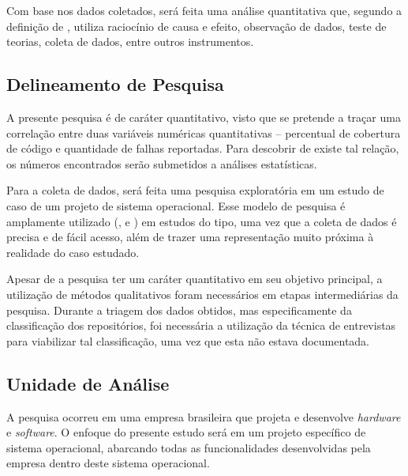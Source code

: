 \documentclass[11.5pt]{article}
\begin{document}
Com base nos dados coletados, será feita uma análise quantitativa que, segundo
a definição de \cite{projetoDePesquisa}, utiliza raciocínio de causa e efeito, observação de dados,
teste de teorias, coleta de dados, entre outros instrumentos.


\subsection{Delineamento de Pesquisa}

A presente pesquisa é de caráter quantitativo, visto que se pretende a traçar uma correlação entre
duas variáveis numéricas quantitativas -- percentual de cobertura de código e quantidade de falhas
reportadas.
Para descobrir de existe tal relação, os números encontrados serão submetidos a análises
estatísticas.

Para a coleta de dados, será feita uma pesquisa exploratória em um estudo de caso de um projeto
de sistema operacional.
Esse modelo de pesquisa é amplamente utilizado (\cite{coverageMetaAnalysis}, \cite{unitTestedCrash}
e \cite{coverageLargeScaleStudy}) em estudos do tipo, uma vez que a coleta de dados é precisa e de
fácil acesso, além de trazer uma representação muito próxima à realidade do caso estudado.

Apesar de a pesquisa ter um caráter quantitativo em seu objetivo principal, a utilização de métodos
qualitativos foram necessários em etapas intermediárias da pesquisa.
Durante a triagem dos dados obtidos, mas especificamente da classificação dos repositórios, foi
necessária a utilização da técnica de entrevistas para viabilizar tal classificação, uma vez que
esta não estava documentada.


\subsection{Unidade de Análise} \label{Unidade de Análise}

A pesquisa ocorreu em uma empresa brasileira que projeta e desenvolve \textit{hardware} e
\textit{software}.
O enfoque do presente estudo será em um projeto específico de sistema operacional, abarcando todas
as funcionalidades desenvolvidas pela empresa dentro deste sistema operacional.
\end{document}
